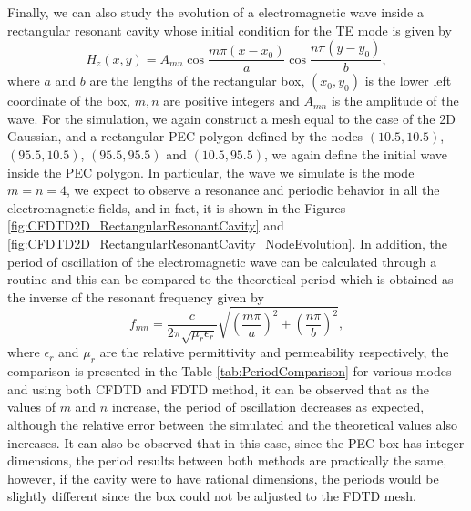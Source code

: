 \documentclass[12pt, oneside]{book}
\begin{document}
Finally, we can also study the evolution of a electromagnetic wave inside a rectangular resonant cavity whose initial condition for the TE mode is given by \cite{pozar2012microwave}
\begin{equation}
    H_z(x, y) = A_{mn}\cos\dfrac{m \pi (x-x_0)}{a} \cos\dfrac{n \pi (y-y_0)}{b},
\label{eq:ResonantRectangularCavity}
\end{equation}
where $a$ and $b$ are the lengths of the rectangular box, $(x_0, y_0)$ is the lower left coordinate of the box, $m, n$ are positive integers and $A_{mn}$ is the amplitude of the wave. For the simulation, we again construct a mesh equal to the case of the 2D Gaussian, and a rectangular PEC polygon defined by the nodes $(10.5,10.5)$, $(95.5,10.5)$, $(95.5, 95.5)$ and $(10.5, 95.5)$, we again define the initial wave inside the PEC polygon. In particular, the wave we simulate is the mode $m = n = 4$, we expect to observe a resonance and periodic behavior in all the electromagnetic fields, and in fact, it is shown in the Figures \ref{fig:CFDTD2D_RectangularResonantCavity} and \ref{fig:CFDTD2D_RectangularResonantCavity_NodeEvolution}. In addition, the period of oscillation of the electromagnetic wave can be calculated through a routine and this can be compared to the theoretical period which is obtained as the inverse of the resonant frequency given by \cite{pozar2012microwave}
\begin{equation}
    f_{mn} = \dfrac{c}{2 \pi \sqrt{\mu_r \epsilon_r}} \sqrt{ \left( \dfrac{m\pi}{a} \right)^2 + \left( \dfrac{n\pi}{b} \right)^2},
\end{equation}
where $\epsilon_r$ and $\mu_r$ are the relative permittivity and permeability respectively, the comparison is presented in the Table \ref{tab:PeriodComparison} for various modes and using both CFDTD and FDTD method, it can be observed that as the values of $m$ and $n$ increase, the period of oscillation decreases as expected, although the relative error between the simulated and the theoretical values also increases. It can also be observed that in this case, since the PEC box has integer dimensions, the period results between both methods are practically the same, however, if the cavity were to have rational dimensions, the periods would be slightly different since the box could not be adjusted to the FDTD mesh. 
\end{document}
